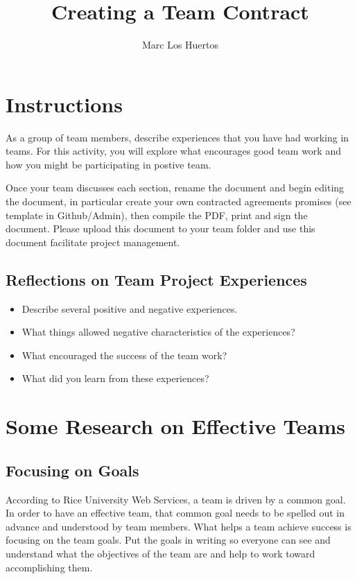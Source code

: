 \documentclass{article}\usepackage[]{graphicx}\usepackage[]{color}
\title{Creating a Team Contract}
\author{Marc Los Huertos}
\begin{document}
\maketitle

\section{Instructions}

As a group of team members, describe experiences that you have had working in teams. For this activity, you will explore what encourages good team work and how you might be participating in postive team.

Once your team discusses each section, rename the document and begin editing the document, in particular create your own contracted agreements promises (see template in Github/Admin), then compile the PDF, print and sign the document. Please upload this document to your team folder and use this document facilitate project management.

\subsection{Reflections on Team Project Experiences}

\begin{itemize}
  \item Describe several positive and negative experiences.
  \item What things allowed negative characteristics of the experiences?
  \item What encouraged the success of the team work?
  \item What did you learn from these experiences?
\end{itemize}

\section{Some Research on Effective Teams}
\subsection{Focusing on Goals}

According to Rice University Web Services, a team is driven by a common goal. In order to have an effective team, that common goal needs to be spelled out in advance and understood by team members. What helps a team achieve success is focusing on the team goals. Put the goals in writing so everyone can see and understand what the objectives of the team are and help to work toward accomplishing them.
\end{document}
